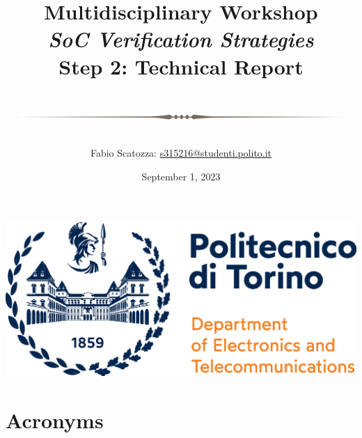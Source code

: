 \documentclass[10pt,  english, makeidx, a4paper, titlepage, oneside]{article}
\title{
    Multidisciplinary Workshop\\
    \textit{SoC Verification Strategies}\\
    \vspace{1cm}
    \textbf{Step 2: Technical Report}\\
    \centerline{\includegraphics[width=0.4\columnwidth]{fig/text-divider.png}}
}
\author{
Fabio Scatozza: \href{mailto:s315216@studenti.polito.it}{s315216@studenti.polito.it}
}
\date{September 1, 2023}
\begin{document}
\makeatletter
\begin{titlepage}
    \centerline{\includegraphics[width=0.4\columnwidth]{fig/poli-det-logo.eps}}
    \vfill
    \begin{center}
        {\huge \@title}
    \end{center}

    \vfill

    \begin{flushleft}
        \large
        \@author
    \end{flushleft}
    \vspace{2cm}
    \centerline{\large \@date}
\end{titlepage}
\makeatother

\tableofcontents
\newpage

\listoflistings
\newpage
\listoffigures
\newpage





\clearpage


\clearpage

\printbibliography

\section*{Acronyms}

\end{document}
